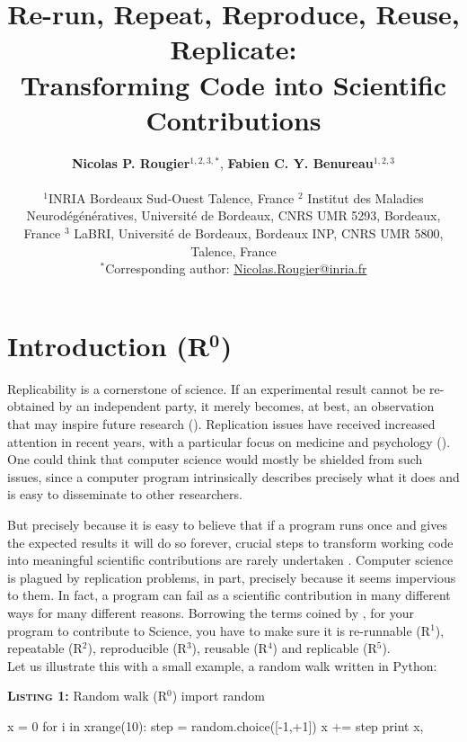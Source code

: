 \documentclass[a4paper,11pt]{article}
\title{Re-run, Repeat, Reproduce, Reuse, Replicate:\\Transforming Code into Scientific Contributions}
\author{
  \textbf{Nicolas P. Rougier}$^{1,2,3,*}$, \textbf{Fabien C. Y. Benureau}$^{1,2,3}$\\
  \begin{minipage}{\textwidth}
    \begin{center}
      \vspace{2mm}
      $^{1}$INRIA Bordeaux Sud-Ouest Talence, France $^{2}$ Institut des
      Maladies Neurodégénératives, Université de Bordeaux, CNRS UMR 5293,
      Bordeaux, France $^{3}$ LaBRI, Université de Bordeaux, Bordeaux INP, CNRS
      UMR 5800, Talence, France\\
      \vspace{2mm}
      $^{*}$Corresponding author:
      \href{mailto:Nicolas.Rougier@inria.fr}{Nicolas.Rougier@inria.fr}
    \end{center}
  \end{minipage}
}
\date{}
\begin{document}
\maketitle
\section*{Introduction (R$^{\mathbf 0}$)}

Replicability is a cornerstone of science.  If an experimental result cannot be
re-obtained by an independent party, it merely becomes, at best, an observation
that may inspire future research (\cite{Mesirov:2010,osc:2015}). Replication
issues have received increased attention in recent years, with a particular focus on medicine and psychology (\cite{Iqbal:2016}).
One could think that
computer science would mostly be shielded from such issues, since a computer program
intrinsically describes precisely what it does and is easy to disseminate to other researchers.

But precisely because it is easy to believe that if a program runs once and gives the expected
results it will do so forever, crucial steps to transform working code into
meaningful scientific contributions are rarely undertaken
\citep{Sandve:2013,Schwab:2000}. Computer science is plagued by replication
problems, in part, precisely because it seems impervious to them. In fact, a
program can fail as a scientific contribution in many different ways for many
different reasons. Borrowing the terms coined by \citeauthor{Goble:2016}
\citep{Goble:2016}, for your program to contribute to Science, you have to make
sure it is re-runnable (R$^1$), repeatable (R$^2$), reproducible (R$^3$),
reusable (R$^4$) and replicable (R$^5$).\\

Let us illustrate this with a small example, a random walk written in Python:\\

\noindent \begin{minipage}[c]{\linewidth}
\begin{code}{\textbf{\textsc{Listing 1:}} Random walk (R$^0$)}
import random

x = 0
for i in xrange(10):
    step = random.choice([-1,+1])
    x += step
    print x,
\end{code}
\end{minipage}

\end{document}
